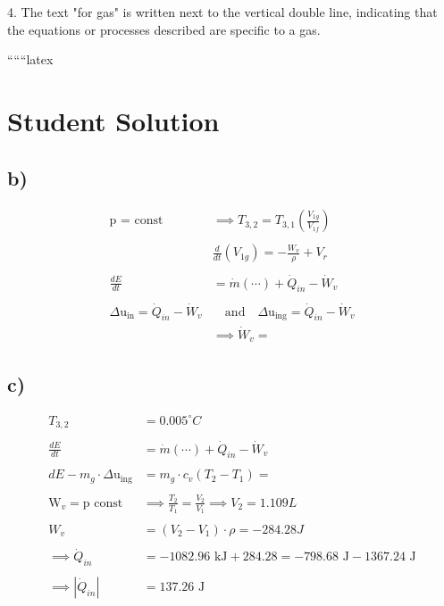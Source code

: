 4. The text "for gas" is written next to the vertical double line, indicating that the equations or processes described are specific to a gas.

``````latex

\section*{Student Solution}

\subsection*{b)}

\begin{align*}
\text{p = const} & \implies T_{3,2} = T_{3,1} \left( \frac{V_{1g}}{V_{1f}} \right) \\
& \\
& \frac{d}{dt} \left( V_{1g} \right) = - \frac{W_v}{\rho} + V_r \\
& \\
\frac{dE}{dt} & = \dot{m} (\cdots) + \dot{Q}_{in} - \dot{W}_v \\
& \\
\Delta \text{u}_{\text{in}} = \dot{Q}_{in} - \dot{W}_v & \quad \text{and} \quad \Delta \text{u}_{\text{ing}} = \dot{Q}_{in} - \dot{W}_v \\
& \implies \dot{W}_v = 
\end{align*}

\subsection*{c)}

\begin{align*}
T_{3,2} &= 0.005^\circ C \\
& \\
\frac{dE}{dt} & = \dot{m} (\cdots) + \dot{Q}_{in} - \dot{W}_v \\
& \\
dE - m_g \cdot \Delta \text{u}_{\text{ing}} & = m_g \cdot c_v (T_2 - T_1) = \\
& \\
\text{W}_v = \text{p const} & \implies \frac{T_2}{T_1} = \frac{V_2}{V_1} \implies V_2 = 1.109 L \\
& \\
W_v & = (V_2 - V_1) \cdot \rho = -284.28 J \\
& \\
\implies \dot{Q}_{in} & = -1082.96 \text{ kJ} + 284.28 = -798.68 \text{ J} - 1367.24 \text{ J} \\
& \\
\implies |\dot{Q}_{in}| & = 137.26 \text{ J}
\end{align*}

